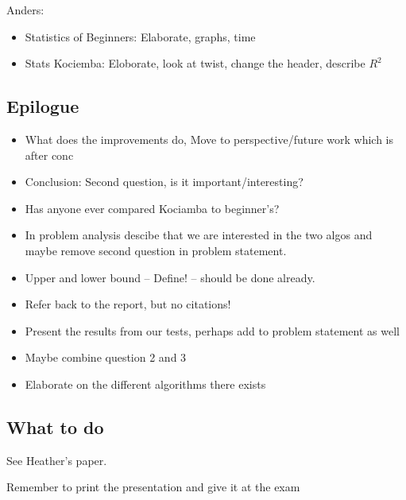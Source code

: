 Anders:
\begin{itemize}
	\item Statistics of Beginners: Elaborate, graphs, time
	\item Stats Kociemba: Eloborate, look at twist, change the header, describe $R^2$
\end{itemize}

\subsection{Epilogue}
\begin{itemize}
	\item What does the improvements do, Move to perspective/future work which is after conc
	\item Conclusion: Second question, is it important/interesting?
	\item Has anyone ever compared Kociamba to beginner's?
	\item In problem analysis descibe that we are interested in the two algos and maybe remove second question in problem statement.
	\item Upper and lower bound -- Define! -- should be done already.
	\item Refer back to the report, but no citations!
	\item Present the results from our tests, perhaps add to problem statement as well
	\item Maybe combine question 2 and 3
	\item Elaborate on the different algorithms there exists
\end{itemize}

\subsection{What to do}
See Heather's paper.


Remember to print the presentation and give it at the exam